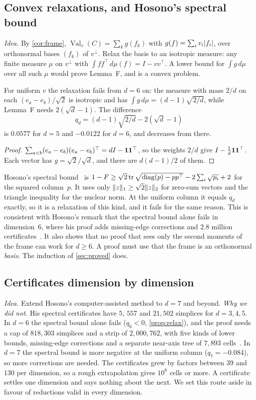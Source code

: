 \documentclass[11pt,a4paper]{article}
\newcommand{\status}[1]{\textsf{\small[#1]}}
\newcommand{\Val}{\operatorname{Val}}
\begin{document}
\subsection{Convex relaxations, and Hosono's spectral bound}\label{sec:relax}
\emph{Idea.} By \cref{cor:frame}, $\Val_v(C)=\sum_kg(f_k)$ with $g(f)=\sum_iv_i\lvert f_i\rvert$, over orthonormal bases $(f_k)$ of $v^\perp$. Relax the basis to an isotropic measure: any finite measure $\mu$ on $v^\perp$ with $\int ff^\top\,d\mu(f)=I-vv^\top$. A lower bound for $\int g\,d\mu$ over all such $\mu$ would prove Lemma~F, and is a convex problem.

\begin{proposition}[\status{proof}]\label{prop:relax}
For uniform $v$ the relaxation fails from $d=6$ on: the measure with mass $2/d$ on each $(e_a-e_b)/\sqrt2$ is isotropic and has $\int g\,d\mu=(d-1)\sqrt{2/d}$, while Lemma~F needs $2(\sqrt d-1)$. The difference
\[
q_d=(d-1)\sqrt{2/d}-2(\sqrt d-1)
\]
is $0.0577$ for $d=5$ and $-0.0122$ for $d=6$, and decreases from there.
\end{proposition}
\begin{proof}
$\sum_{a<b}(e_a-e_b)(e_a-e_b)^\top=dI-\mathbf 1\mathbf 1^\top$, so the weights $2/d$ give $I-\frac1d\mathbf 1\mathbf 1^\top$. Each vector has $g=\sqrt2/\sqrt d$, and there are $d(d-1)/2$ of them.
\end{proof}

Hosono's spectral bound~\cite{hosono} is $1-F\ge\sqrt2\operatorname{tr}\sqrt{\operatorname{diag}(p)-pp^\top}-2\sum_i\sqrt{p_i}+2$ for the squared column~$p$. It uses only $\lVert z\rVert_1\ge\sqrt2\lVert z\rVert_2$ for zero-sum vectors and the triangle inequality for the nuclear norm. At the uniform column it equals $q_d$ exactly, so it is a relaxation of this kind, and it fails for the same reason. This is consistent with Hosono's remark that the spectral bound alone fails in dimension~$6$, where his proof adds missing-edge corrections and $2.8$ million certificates~\cite{hosono}. It also shows that no proof that sees only the second moments of the frame can work for $d\ge6$. A proof must use that the frame is an orthonormal \emph{basis}. The induction of \cref{sec:proved} does.

\subsection{Certificates dimension by dimension}
\emph{Idea.} Extend Hosono's computer-assisted method to $d=7$ and beyond. \emph{Why we did not.} His spectral certificates have $5$, $557$ and $21{,}502$ simplices for $d=3,4,5$. In $d=6$ the spectral bound alone fails ($q_6<0$, \cref{prop:relax}), and the proof needs a cap of $818{,}303$ simplices and a strip of $2{,}000{,}762$, with five kinds of lower bounds, missing-edge corrections and a separate near-axis tree of $7{,}893$ cells~\cite{hosono}. In $d=7$ the spectral bound is more negative at the uniform column ($q_7=-0.084$), so more corrections are needed. The certificates grew by factors between $39$ and $130$ per dimension, so a rough extrapolation gives $10^8$ cells or more. A certificate settles one dimension and says nothing about the next. We set this route aside in favour of reductions valid in every dimension.
\end{document}
